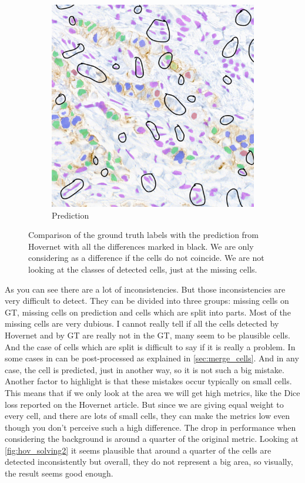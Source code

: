 \begin{figure}[H]
\begin{subfigure}{0.45\textwidth}
      \includegraphics[width=\textwidth]{imgs/scaling/pred.png}
      \caption{Prediction}
    \end{subfigure}
    \caption{Comparison of the ground truth labels with the prediction from Hovernet with all the differences marked in black. We are only considering as a difference if the cells do not coincide. We are not looking at the classes of detected cells, just at the missing cells.}
    \label{fig:hov_solving2}
\end{figure}

As you can see there are a lot of inconsistencies. But those inconsistencies are very difficult to detect. They can be divided into three groups: missing cells on GT, missing cells on prediction and cells which are split into parts. Most of the missing cells are very dubious. I cannot really tell if all the cells detected by Hovernet and by GT are really not in the GT, many seem to be plausible cells. And the case of cells which are split is difficult to say if it is really a problem. In some cases in can be post-processed as explained in \autoref{sec:merge_cells}. And in any case, the cell is predicted, just in another way, so it is not such a big mistake. Another factor to highlight is that these mistakes occur typically on small cells. This means that if we only look at the area we will get high metrics, like the Dice loss reported on the Hovernet article. But since we are giving equal weight to every cell, and there are lots of small cells, they can make the metrics low even though you don't perceive such a high difference. The drop in performance when considering the background is around a quarter of the original metric. Looking at \autoref{fig:hov_solving2} it seems plausible that around a quarter of the cells are detected inconsistently but overall, they do not represent a big area, so visually, the result seems good enough.

